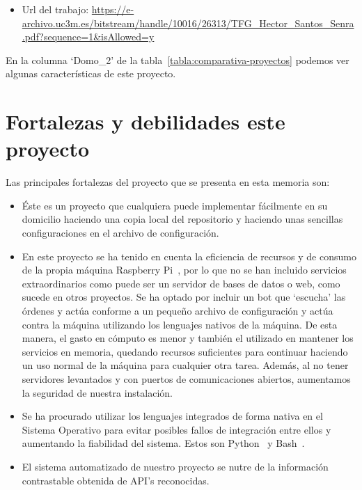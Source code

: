 \begin{itemize}
    \item Url del trabajo: \url{https://e-archivo.uc3m.es/bitstream/handle/10016/26313/TFG_Hector_Santos_Senra.pdf?sequence=1&isAllowed=y}
\end{itemize}

En la columna `Domo\_2' de la tabla~\ref{tabla:comparativa-proyectos} podemos ver algunas características de este proyecto.

\section{Fortalezas y debilidades este proyecto}

Las principales fortalezas del proyecto que se presenta en esta memoria son:

\begin{itemize}
\item
    Éste es un proyecto que cualquiera puede implementar fácilmente en su domicilio haciendo una copia local del repositorio y haciendo unas sencillas configuraciones en el archivo de configuración.
    
\item
    En este proyecto se ha tenido en cuenta la eficiencia de recursos y de consumo de la propia máquina Raspberry Pi~\cite{misc:RbPWeb}, por lo que no se han incluido servicios extraordinarios como puede ser un servidor de bases de datos o web, como sucede en otros proyectos. Se ha optado por incluir un bot que `escucha' las órdenes y actúa conforme a un pequeño archivo de configuración y actúa contra la máquina utilizando los lenguajes nativos de la máquina. De esta manera, el gasto en cómputo es menor y también el utilizado en mantener los servicios en memoria, quedando recursos suficientes para continuar haciendo un uso normal de la máquina para cualquier otra tarea.
    Además, al no tener servidores levantados y con puertos de comunicaciones abiertos, aumentamos la seguridad de nuestra instalación.

\item
    Se ha procurado utilizar los lenguajes integrados de forma nativa en el Sistema Operativo para evitar posibles fallos de integración entre ellos y aumentando la fiabilidad del sistema. Estos son Python~\cite{misc:Python} y Bash~\cite{misc:Linux}. 
    
\item
    El sistema automatizado de nuestro proyecto se nutre de la información contrastable obtenida de API's reconocidas.
    

\end{itemize}
